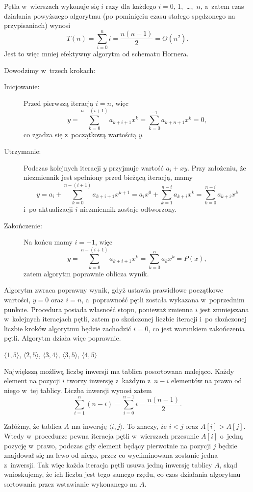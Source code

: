 Pętla  w~wierszach \twodashes{\ref{li:naive-polynomial-evaluation-for-begin}}{\ref{li:naive-polynomial-evaluation-for-end}} wykonuje się $i$ razy dla każdego $i=0$, 1,~\dots,~$n$, a~zatem czas działania powyższego algorytmu (po pominięciu czasu stałego spędzonego na przypisaniach) wynosi
\[
	T(n) = \sum_{i=0}^ni = \frac{n(n+1)}{2} = \Theta(n^2).
\]
Jest to więc mniej efektywny algorytm od schematu Hornera.

\subproblem %
Dowodzimy w~trzech krokach:
\begin{description}
	\item[Inicjowanie:] Przed pierwszą iteracją $i=n$, więc
	\[
	    y = \sum_{k=0}^{n-(i+1)}a_{k+i+1}x^k = \sum_{k=0}^{-1}a_{k+n+1}x^k = 0,
	\]
	co zgadza się z~początkową wartością $y$.
	\item[Utrzymanie:] Podczas kolejnych iteracji $y$ przyjmuje wartość $a_i+xy$. Przy założeniu, że niezmiennik jest spełniony przed bieżącą iteracją, mamy
	\[
		y = a_i+\sum_{k=0}^{n-(i+1)}a_{k+i+1}x^{k+1} = a_ix^0+\sum_{k=1}^{n-i}a_{k+i}x^k = \sum_{k=0}^{n-i}a_{k+i}x^k
	\]
	i~po aktualizacji $i$ niezmiennik zostaje odtworzony.
	\item[Zakończenie:] Na końcu mamy $i=-1$, więc
	\[
		y = \sum_{k=0}^{n-(i+1)}a_{k+i+1}x^k = \sum_{k=0}^na_kx^k = P(x),
	\]
	zatem algorytm poprawnie oblicza wynik.
\end{description}

\subproblem %
Algorytm zwraca poprawny wynik, gdyż ustawia prawidłowe początkowe wartości, $y=0$ oraz $i=n$, a~poprawność pętli  została wykazana w~poprzednim punkcie. Procedura posiada własność stopu, ponieważ zmienna $i$ jest zmniejszana w~kolejnych iteracjach pętli, zatem po skończonej liczbie iteracji i~po skończonej liczbie kroków algorytmu będzie zachodzić $i=0$, co jest warunkiem zakończenia pętli. Algorytm działa więc poprawnie.


\subproblem %
$\langle1,5\rangle$, $\langle2,5\rangle$, $\langle3,4\rangle$, $\langle3,5\rangle$, $\langle4,5\rangle$

\subproblem %
Największą możliwą liczbę inwersji ma tablica posortowana malejąco. Każdy element na pozycji $i$ tworzy inwersję z~każdym z~$n-i$ elementów na prawo od niego w~tej tablicy. Liczba inwersji wynosi zatem
\[
	\sum_{i=1}^n(n-i) = \sum_{i=0}^{n-1}i = \frac{n(n-1)}{2}.
\]

\subproblem %
Załóżmy, że tablica $A$ ma inwersję $\langle i,j\rangle$. To znaczy, że $i<j$ oraz $A[i]>A[j]$. Wtedy w~procedurze  pewna iteracja pętli  w~wierszach  przesunie $A[i]$ o~jedną pozycję w~prawo, podczas gdy element będący pierwotnie na pozycji $j$ będzie znajdował się na lewo od niego, przez co wyeliminowana zostanie jedna z~inwersji. Tak więc każda iteracja pętli  usuwa jedną inwersję tablicy $A$, skąd wnioskujemy, że ich liczba jest tego samego rzędu, co czas działania algorytmu sortowania przez wstawianie wykonanego na $A$.

